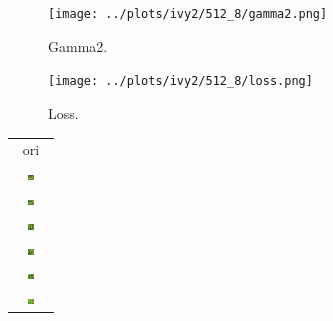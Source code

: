 \documentclass[letter]{article}
\begin{document}
\begin{figure}[h!]
	\centering
	\texttt{[image: ../plots/ivy2/512\_8/gamma2.png]}
	\caption{\label{fig:gamma1}Gamma2.}
\end{figure}

\begin{figure}[h!]
	\centering
	\texttt{[image: ../plots/ivy2/512\_8/loss.png]}
	\caption{\label{fig:gamma1}Loss.}
\end{figure}

\newpage

\begin{table}[h!]
	\centering
	\begin{tabular}{c}
		ori\tabularnewline
		\includegraphics[width=0.17\textwidth]{../data/ivy2/512/1} \tabularnewline		\includegraphics[width=0.17\textwidth]{../data/ivy2/512/2} \tabularnewline		\includegraphics[width=0.17\textwidth]{../data/ivy2/512/3} \tabularnewline		\includegraphics[width=0.17\textwidth]{../data/ivy2/512/4} \tabularnewline		\includegraphics[width=0.17\textwidth]{../data/ivy2/512/5} \tabularnewline		\includegraphics[width=0.17\textwidth]{../data/ivy2/512/6} \tabularnewline

\end{tabular}
\end{table}
\end{document}
